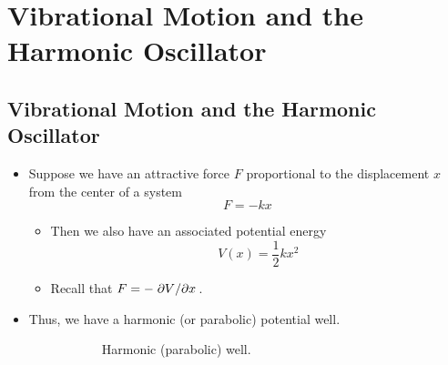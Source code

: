 \documentclass[../notes.tex]{subfiles}
\begin{document}
\chapter{Vibrational Motion and the Harmonic Oscillator}
\section{Vibrational Motion and the Harmonic Oscillator}
\begin{itemize}
    \item {}Suppose we have an attractive force $F$ proportional to the displacement $x$ from the center of a system
    \begin{equation*}
        F = -kx
    \end{equation*}
    \begin{itemize}
        \item Then we also have an associated potential energy
        \begin{equation*}
            V(x) = \frac{1}{2}kx^2
        \end{equation*}
        \item Recall that $F=-\pdv*{V}{x}$.
    \end{itemize}
    \item Thus, we have a harmonic (or parabolic) potential well.
    \begin{figure}[h!]
        \centering
        \begin{subfigure}[b]{0.4\linewidth}
            \centering
            \caption{Harmonic (parabolic) well.}
            \label{fig:parabolicPotentiala}
        \end{subfigure}
        \begin{subfigure}[b]{0.4\linewidth}
            \centering
\end{subfigure}
\end{figure}
\end{itemize}
\end{document}
